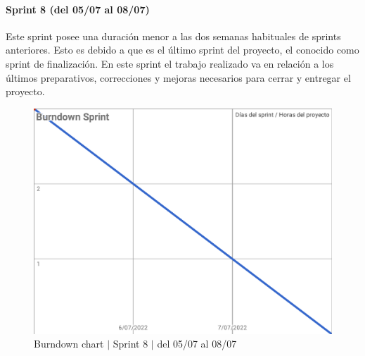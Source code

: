 \paragraph{Sprint 8 (del 05/07 al 08/07)}
Este sprint posee una duración menor a las dos semanas habituales de sprints anteriores. Esto es debido a que es el último sprint del proyecto, el conocido como sprint de finalización. En este sprint el trabajo realizado va en relación a los últimos preparativos, correcciones y mejoras necesarios para cerrar y entregar el proyecto.
\begin{figure}[H]
    \centering
    \includegraphics[width=1\linewidth]{text/image/BurndownChart8.pdf}
    \caption{Burndown chart $|$ Sprint 8 $|$ del 05/07 al 08/07}
    \label{fig:burndown_chart_8}
\end{figure}